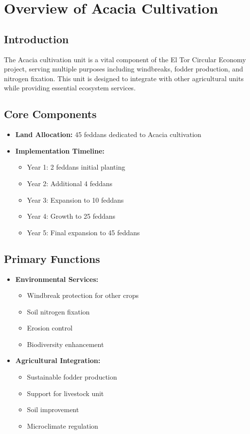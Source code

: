 \section{Overview of Acacia Cultivation}

\subsection{Introduction}
The Acacia cultivation unit is a vital component of the El Tor Circular Economy project, serving multiple purposes including windbreaks, fodder production, and nitrogen fixation. This unit is designed to integrate with other agricultural units while providing essential ecosystem services.

\subsection{Core Components}
\begin{itemize}
    \item \textbf{Land Allocation:} 45 feddans dedicated to Acacia cultivation
    \item \textbf{Implementation Timeline:}
    \begin{itemize}
        \item Year 1: 2 feddans initial planting
        \item Year 2: Additional 4 feddans
        \item Year 3: Expansion to 10 feddans
        \item Year 4: Growth to 25 feddans
        \item Year 5: Final expansion to 45 feddans
    \end{itemize}
\end{itemize}

\subsection{Primary Functions}
\begin{itemize}
    \item \textbf{Environmental Services:}
    \begin{itemize}
        \item Windbreak protection for other crops
        \item Soil nitrogen fixation
        \item Erosion control
        \item Biodiversity enhancement
    \end{itemize}
    
    \item \textbf{Agricultural Integration:}
    \begin{itemize}
        \item Sustainable fodder production
        \item Support for livestock unit
        \item Soil improvement
        \item Microclimate regulation
    \end{itemize}
\end{itemize}

